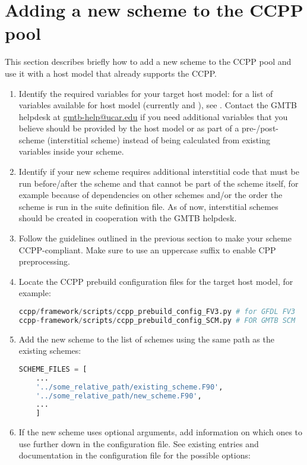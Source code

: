 \section{Adding a new scheme to the CCPP pool}
\label{sec_addscheme}
This section describes briefly how to add a new scheme to the CCPP pool and use it with a host model that already supports the CCPP.
\begin{enumerate}
\item Identify the required variables for your target host model: for a list of variables available for host model  (currently  and ), see . Contact the GMTB helpdesk at \url{gmtb-help@ucar.edu} if you need additional variables that you believe should be provided by the host model or as part of a pre-/post-scheme (interstitial scheme) instead of being calculated from existing variables inside your scheme.
\item Identify if your new scheme requires additional interstitial code that must be run before/after the scheme and that cannot be part of the scheme itself, for example because of dependencies on other schemes and/or the order the scheme is run in the suite definition file. As of now, interstitial schemes should be created in cooperation with the GMTB helpdesk.
\item Follow the guidelines outlined in the previous section to make your scheme CCPP-compliant. Make sure to use an uppercase suffix  to enable CPP preprocessing.
\item Locate the CCPP prebuild configuration files for the target host model, for example:
\begin{lstlisting}[language=Python]
ccpp/framework/scripts/ccpp_prebuild_config_FV3.py # for GFDL FV3
ccpp-framework/scripts/ccpp_prebuild_config_SCM.py # FOR GMTB SCM
\end{lstlisting}
\item Add the new scheme to the list of schemes using the same path as the existing schemes:
\begin{samepage}
\begin{lstlisting}[language=Python]
SCHEME_FILES = [
    ...
    '../some_relative_path/existing_scheme.F90',
    '../some_relative_path/new_scheme.F90',
    ...
    ]
\end{lstlisting}
\end{samepage}
\item If the new scheme uses optional arguments, add information on which ones to use further down in the configuration file. See existing entries and documentation in the configuration file for the possible options:

\end{enumerate}
